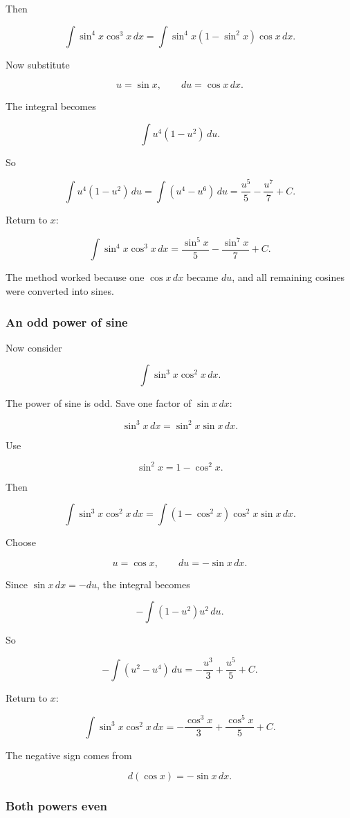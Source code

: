 Then

\[
\int \sin^4 x\cos^3 x\,dx
=
\int \sin^4 x(1-\sin^2 x)\cos x\,dx.
\]

Now substitute

\[
u=\sin x,
\qquad
du=\cos x\,dx.
\]

The integral becomes

\[
\int u^4(1-u^2)\,du.
\]

So

\[
\int u^4(1-u^2)\,du
=
\int (u^4-u^6)\,du
=
\frac{u^5}{5}-\frac{u^7}{7}+C.
\]

Return to \(x\):

\[
\boxed{
\int \sin^4 x\cos^3 x\,dx
=
\frac{\sin^5 x}{5}-\frac{\sin^7 x}{7}+C.
}
\]

The method worked because one \(\cos x\,dx\) became \(du\), and all remaining
cosines were converted into sines.

\subsubsection*{An odd power of sine}

Now consider

\[
\int \sin^3 x\cos^2 x\,dx.
\]

The power of sine is odd.  Save one factor of \(\sin x\,dx\):

\[
\sin^3 x\,dx=\sin^2 x\sin x\,dx.
\]

Use

\[
\sin^2 x=1-\cos^2 x.
\]

Then

\[
\int \sin^3 x\cos^2 x\,dx
=
\int (1-\cos^2 x)\cos^2 x\sin x\,dx.
\]

Choose

\[
u=\cos x,
\qquad
du=-\sin x\,dx.
\]

Since \(\sin x\,dx=-du\), the integral becomes

\[
-\int (1-u^2)u^2\,du.
\]

So

\[
-\int (u^2-u^4)\,du
=
-\frac{u^3}{3}+\frac{u^5}{5}+C.
\]

Return to \(x\):

\[
\boxed{
\int \sin^3 x\cos^2 x\,dx
=
-\frac{\cos^3 x}{3}+\frac{\cos^5 x}{5}+C.
}
\]

The negative sign comes from

\[
d(\cos x)=-\sin x\,dx.
\]

\subsubsection*{Both powers even}

